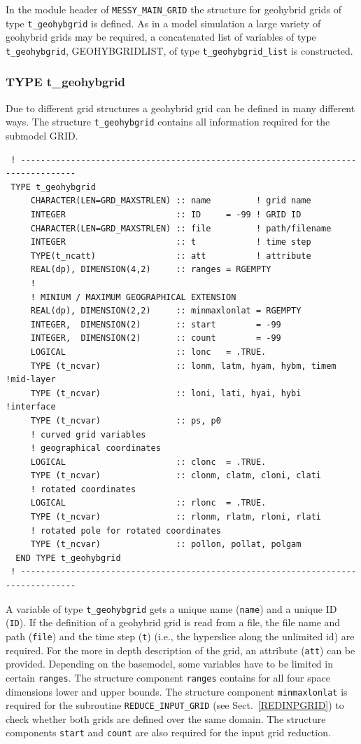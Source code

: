 \documentclass[11pt,twoside]{article}
\begin{document}
In the module header of \verb|MESSY_MAIN_GRID| the structure for geohybrid 
grids of type \verb|t_geohybgrid| is defined.
As in a model simulation a large variety of geohybrid grids may be required,
a concatenated list of variables of type  \verb|t_geohybgrid|,
 GEOHYBGRIDLIST, of type \verb|t_geohybgrid_list| is constructed.
 
\subsubsection{TYPE t\_geohybgrid \label{Tghgrid}}
Due to different grid structures a geohybrid grid can be defined in
many different ways. The structure \verb|t_geohybgrid| contains all
information required for the submodel GRID.
\begin{verbatim}
 ! ---------------------------------------------------------------------------------
 TYPE t_geohybgrid
     CHARACTER(LEN=GRD_MAXSTRLEN) :: name         ! grid name
     INTEGER                      :: ID     = -99 ! GRID ID
     CHARACTER(LEN=GRD_MAXSTRLEN) :: file         ! path/filename
     INTEGER                      :: t            ! time step
     TYPE(t_ncatt)                :: att          ! attribute
     REAL(dp), DIMENSION(4,2)     :: ranges = RGEMPTY
     ! 
     ! MINIUM / MAXIMUM GEOGRAPHICAL EXTENSION
     REAL(dp), DIMENSION(2,2)     :: minmaxlonlat = RGEMPTY
     INTEGER,  DIMENSION(2)       :: start        = -99
     INTEGER,  DIMENSION(2)       :: count        = -99
     LOGICAL                      :: lonc   = .TRUE.
     TYPE (t_ncvar)               :: lonm, latm, hyam, hybm, timem !mid-layer
     TYPE (t_ncvar)               :: loni, lati, hyai, hybi        !interface
     TYPE (t_ncvar)               :: ps, p0
     ! curved grid variables
     ! geographical coordinates
     LOGICAL                      :: clonc  = .TRUE.
     TYPE (t_ncvar)               :: clonm, clatm, cloni, clati 
     ! rotated coordinates
     LOGICAL                      :: rlonc  = .TRUE.
     TYPE (t_ncvar)               :: rlonm, rlatm, rloni, rlati 
     ! rotated pole for rotated coordinates
     TYPE (t_ncvar)               :: pollon, pollat, polgam
  END TYPE t_geohybgrid
 ! ---------------------------------------------------------------------------------
\end{verbatim}
A variable of type \verb|t_geohybgrid| gets a unique name (\verb|name|) and a
 unique ID (\verb|ID|).
If the definition of  a geohybrid grid is read from a file, the file name and
path (\verb|file|) and the time step (\verb|t|) (i.e., the hyperslice
 along the unlimited id) are required.
For the more in depth description of the grid, an  attribute (\verb|att|)
can be provided. Depending on the basemodel, some variables have to be
 limited in certain \verb|ranges|. The structure component \verb|ranges|
contains for all four space dimensions lower and upper bounds. 
The structure component \verb|minmaxlonlat| is required for the subroutine 
\verb|REDUCE_INPUT_GRID| (see Sect.~\ref{REDINPGRID}) to check whether
both grids are defined over the same domain.
The structure components \verb|start| and \verb|count| are also required
for the input grid reduction.
\end{document}
